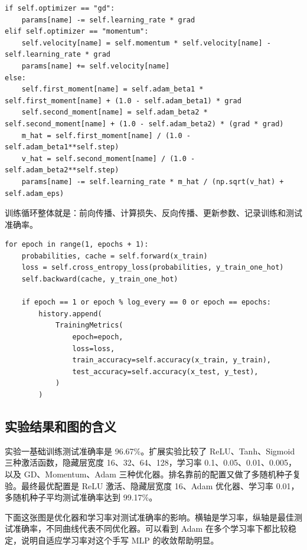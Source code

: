 \documentclass[UTF8]{ctexart}
\begin{document}
\begin{lstlisting}[caption={实验一：三种优化器的参数更新}]
if self.optimizer == "gd":
    params[name] -= self.learning_rate * grad
elif self.optimizer == "momentum":
    self.velocity[name] = self.momentum * self.velocity[name] - self.learning_rate * grad
    params[name] += self.velocity[name]
else:
    self.first_moment[name] = self.adam_beta1 * self.first_moment[name] + (1.0 - self.adam_beta1) * grad
    self.second_moment[name] = self.adam_beta2 * self.second_moment[name] + (1.0 - self.adam_beta2) * (grad * grad)
    m_hat = self.first_moment[name] / (1.0 - self.adam_beta1**self.step)
    v_hat = self.second_moment[name] / (1.0 - self.adam_beta2**self.step)
    params[name] -= self.learning_rate * m_hat / (np.sqrt(v_hat) + self.adam_eps)
\end{lstlisting}

训练循环整体就是：前向传播、计算损失、反向传播、更新参数、记录训练和测试准确率。

\begin{lstlisting}[caption={实验一：训练循环}]
for epoch in range(1, epochs + 1):
    probabilities, cache = self.forward(x_train)
    loss = self.cross_entropy_loss(probabilities, y_train_one_hot)
    self.backward(cache, y_train_one_hot)

    if epoch == 1 or epoch % log_every == 0 or epoch == epochs:
        history.append(
            TrainingMetrics(
                epoch=epoch,
                loss=loss,
                train_accuracy=self.accuracy(x_train, y_train),
                test_accuracy=self.accuracy(x_test, y_test),
            )
        )
\end{lstlisting}

\subsection{实验结果和图的含义}
实验一基础训练测试准确率是 96.67\%。扩展实验比较了 ReLU、Tanh、Sigmoid 三种激活函数，隐藏层宽度 16、32、64、128，学习率 0.1、0.05、0.01、0.005，以及 GD、Momentum、Adam 三种优化器。排名靠前的配置又做了多随机种子复验。最终最优配置是 ReLU 激活、隐藏层宽度 16、Adam 优化器、学习率 0.01，多随机种子平均测试准确率达到 99.17\%。

\begin{table}[H]
\centering
\caption{MLP 超参数搜索靠前配置}

\end{table}

下面这张图是优化器和学习率对测试准确率的影响。横轴是学习率，纵轴是最佳测试准确率，不同曲线代表不同优化器。可以看到 Adam 在多个学习率下都比较稳定，说明自适应学习率对这个手写 MLP 的收敛帮助明显。
\end{document}
